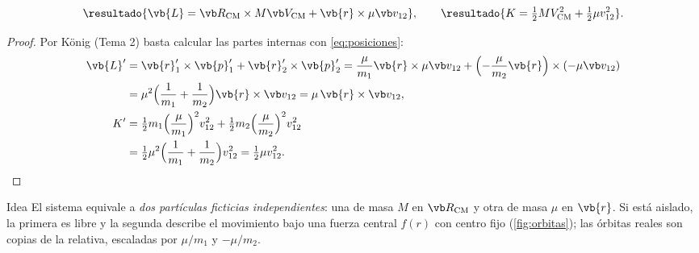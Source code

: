 \begin{teorema}
\label{teo:konig2}
\begin{equation}
  \resultado{\vb{L}=\Rcm\times M\Vcm+\vb{r}\times\mu\vrel},\qquad
  \resultado{K=\tfrac12MV\cm^{2}+\tfrac12\mu v_{12}^{2}} .
  \label{eq:konig2}
\end{equation}
\end{teorema}

\begin{proof}
Por König (Tema 2) basta calcular las partes internas con \eqref{eq:posiciones}:
\begin{align*}
  \vb{L}'&=\vb{r}_{1}'\times\vb{p}_{1}'+\vb{r}_{2}'\times\vb{p}_{2}'
  =\frac{\mu}{m_{1}}\vb{r}\times\mu\vrel+\Bigl(-\frac{\mu}{m_{2}}\vb{r}\Bigr)\times(-\mu\vrel)\\
  &=\mu^{2}\Bigl(\frac1{m_{1}}+\frac1{m_{2}}\Bigr)\vb{r}\times\vrel=\mu\,\vb{r}\times\vrel ,\\
  K'&=\tfrac12m_{1}\Bigl(\frac{\mu}{m_{1}}\Bigr)^{2}v_{12}^{2}+\tfrac12m_{2}\Bigl(\frac{\mu}{m_{2}}\Bigr)^{2}v_{12}^{2}\\
  &=\tfrac12\mu^{2}\Bigl(\frac1{m_{1}}+\frac1{m_{2}}\Bigr)v_{12}^{2}=\tfrac12\mu v_{12}^{2} .\qedhere
\end{align*}
\end{proof}

\begin{clave}{Idea}
El sistema equivale a \emph{dos partículas ficticias independientes}: una de masa $M$
en $\Rcm$ y otra de masa $\mu$ en $\vb{r}$. Si está aislado, la primera es libre y la
segunda describe el movimiento bajo una fuerza central $f(r)$ con centro fijo
(\cref{fig:orbitas}); las órbitas reales son copias de la relativa, escaladas por
$\mu/m_{1}$ y $-\mu/m_{2}$.
\end{clave}

